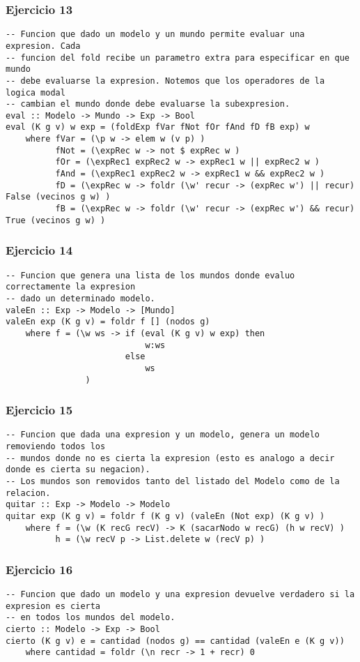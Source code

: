 \subsubsection*{Ejercicio 13}
\begin{lstlisting}
-- Funcion que dado un modelo y un mundo permite evaluar una expresion. Cada
-- funcion del fold recibe un parametro extra para especificar en que mundo 
-- debe evaluarse la expresion. Notemos que los operadores de la logica modal
-- cambian el mundo donde debe evaluarse la subexpresion.
eval :: Modelo -> Mundo -> Exp -> Bool
eval (K g v) w exp = (foldExp fVar fNot fOr fAnd fD fB exp) w
    where fVar = (\p w -> elem w (v p) )
          fNot = (\expRec w -> not $ expRec w ) 
          fOr = (\expRec1 expRec2 w -> expRec1 w || expRec2 w )
          fAnd = (\expRec1 expRec2 w -> expRec1 w && expRec2 w )
          fD = (\expRec w -> foldr (\w' recur -> (expRec w') || recur) False (vecinos g w) )
          fB = (\expRec w -> foldr (\w' recur -> (expRec w') && recur) True (vecinos g w) )		
\end{lstlisting}
\vspace{1cm}

\subsubsection*{Ejercicio 14}
\begin{lstlisting}
-- Funcion que genera una lista de los mundos donde evaluo correctamente la expresion
-- dado un determinado modelo.
valeEn :: Exp -> Modelo -> [Mundo]
valeEn exp (K g v) = foldr f [] (nodos g)
	where f = (\w ws -> if (eval (K g v) w exp) then 
							w:ws 
						else 
							ws	
				)	
\end{lstlisting}
\vspace{1cm}

\subsubsection*{Ejercicio 15}
\begin{lstlisting}
-- Funcion que dada una expresion y un modelo, genera un modelo removiendo todos los
-- mundos donde no es cierta la expresion (esto es analogo a decir donde es cierta su negacion).
-- Los mundos son removidos tanto del listado del Modelo como de la relacion.
quitar :: Exp -> Modelo -> Modelo
quitar exp (K g v) = foldr f (K g v) (valeEn (Not exp) (K g v) )
    where f = (\w (K recG recV) -> K (sacarNodo w recG) (h w recV) )
          h = (\w recV p -> List.delete w (recV p) )
\end{lstlisting}
\vspace{1cm}

\subsubsection*{Ejercicio 16}
\begin{lstlisting}
-- Funcion que dado un modelo y una expresion devuelve verdadero si la expresion es cierta
-- en todos los mundos del modelo.
cierto :: Modelo -> Exp -> Bool
cierto (K g v) e = cantidad (nodos g) == cantidad (valeEn e (K g v))
	where cantidad = foldr (\n recr -> 1 + recr) 0
\end{lstlisting}
\vspace{1cm}